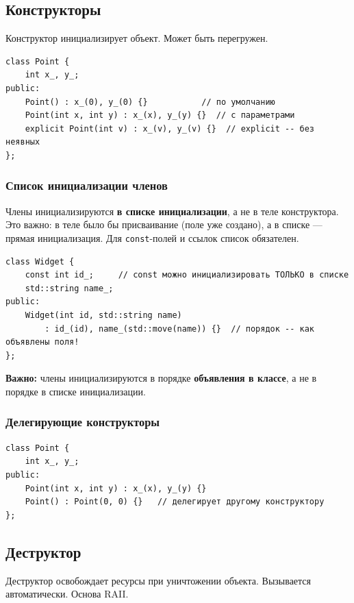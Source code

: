 \subsection{Конструкторы}

Конструктор инициализирует объект. Может быть перегружен.

\begin{lstlisting}
class Point {
    int x_, y_;
public:
    Point() : x_(0), y_(0) {}           // по умолчанию
    Point(int x, int y) : x_(x), y_(y) {}  // с параметрами
    explicit Point(int v) : x_(v), y_(v) {}  // explicit -- без неявных
};
\end{lstlisting}

\subsubsection{Список инициализации членов}

Члены инициализируются \textbf{в списке инициализации}, а не в теле конструктора.
Это важно: в теле было бы присваивание (поле уже создано), а в списке ---
прямая инициализация. Для \texttt{const}-полей и ссылок список обязателен.

\begin{lstlisting}
class Widget {
    const int id_;     // const можно инициализировать ТОЛЬКО в списке
    std::string name_;
public:
    Widget(int id, std::string name)
        : id_(id), name_(std::move(name)) {}  // порядок -- как объявлены поля!
};
\end{lstlisting}

\textbf{Важно:} члены инициализируются в порядке \textbf{объявления в классе}, а
не в порядке в списке инициализации.

\subsubsection{Делегирующие конструкторы}

\begin{lstlisting}
class Point {
    int x_, y_;
public:
    Point(int x, int y) : x_(x), y_(y) {}
    Point() : Point(0, 0) {}   // делегирует другому конструктору
};
\end{lstlisting}

\subsection{Деструктор}

Деструктор освобождает ресурсы при уничтожении объекта. Вызывается автоматически.
Основа RAII.

